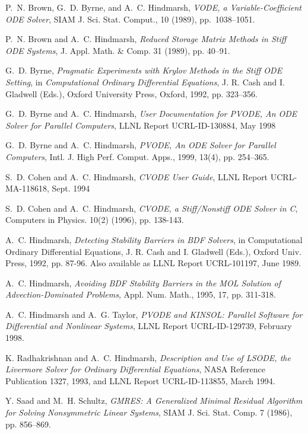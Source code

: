 
\begin{thebibliography}{99}

{P.~N. Brown, G.~D. Byrne, and A.~C. Hindmarsh}, {\em {VODE}, a
Variable-Coefficient {ODE} Solver}, SIAM J. Sci. Stat. Comput., 10 (1989),
pp.~1038--1051.

P.~N. Brown and A.~C. Hindmarsh, {\em Reduced Storage Matrix Methods
in Stiff ODE Systems}, J. Appl. Math. \& Comp. 31 (1989), pp. 40--91.

G.~D. Byrne, {\em Pragmatic Experiments with Krylov Methods in
the Stiff ODE Setting}, in {\em Computational Ordinary Differential
Equations}, J. R. Cash and I. Gladwell (Eds.), Oxford University
Press, Oxford, 1992, pp. 323--356.

G.~D. Byrne and A.~C. Hindmarsh, {\em User Documentation for PVODE,
An ODE Solver for Parallel Computers}, LLNL Report UCRL-ID-130884, May 1998

G.~D. Byrne and A.~C. Hindmarsh, {\em PVODE, An ODE Solver for Parallel Computers}, 
Intl. J. High Perf. Comput. Apps., 1999, 13(4), pp. 254--365.

S.~D. Cohen and A.~C. Hindmarsh, {\em CVODE User Guide},
LLNL Report UCRL-MA-118618, Sept. 1994

S.~D. Cohen and A.~C. Hindmarsh, {\em CVODE, a Stiff/Nonstiff ODE Solver in C},
Computers in Physics. 10(2) (1996), pp. 138-143.

A.~C. Hindmarsh, {\em Detecting Stability Barriers in BDF Solvers},
in Computational Ordinary Differential Equations, J. R. Cash and
I. Gladwell (Eds.), Oxford Univ. Press, 1992, pp. 87-96.  Also
available as LLNL Report UCRL-101197, June 1989.

A.~C. Hindmarsh, {\em Avoiding BDF Stability Barriers in the MOL
Solution of Advection-Dominated Problems},
Appl. Num. Math., 1995, 17, pp. 311-318.

A.~C. Hindmarsh and A.~G. Taylor, {\em PVODE and KINSOL: Parallel Software
for Differential and Nonlinear Systems}, LLNL Report UCRL-ID-129739, February 1998.

K. Radhakrishnan and A.~C. Hindmarsh, {\em Description and Use
of LSODE, the Livermore Solver for Ordinary Differential Equations},
NASA Reference Publication 1327, 1993, and LLNL Report UCRL-ID-113855, March
1994.

Y. Saad and M.~H. Schultz, {\em GMRES: A Generalized Minimal Residual
Algorithm for Solving Nonsymmetric Linear Systems}, SIAM J. Sci. Stat.
Comp. 7 (1986), pp. 856--869.

\end{thebibliography}

